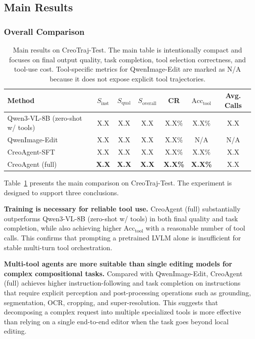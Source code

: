 \documentclass[11pt]{article}
\begin{document}
\subsection{Main Results}

\subsubsection{Overall Comparison}

\begin{table}[t]
\centering
\caption{Main results on CreoTraj-Test. The main table is intentionally compact and focuses on final output quality, task completion, tool selection correctness, and tool-use cost. Tool-specific metrics for QwenImage-Edit are marked as N/A because it does not expose explicit tool trajectories.}
\label{tab:main}
\begin{tabular}{lcccccc}
\toprule
\textbf{Method} & $S_{\text{inst}}$ & $S_{\text{qual}}$ & $S_{\text{overall}}$ & CR & $\text{Acc}_{\text{tool}}$ & Avg. Calls \\
\midrule
Qwen3-VL-8B (zero-shot w/ tools) & X.X & X.X & X.X & X.X\% & X.X\% & X.X \\
QwenImage-Edit & X.X & X.X & X.X & X.X\% & N/A & N/A \\
CreoAgent-SFT & X.X & X.X & X.X & X.X\% & X.X\% & X.X \\
CreoAgent (full) & \textbf{X.X} & \textbf{X.X} & \textbf{X.X} & \textbf{X.X\%} & \textbf{X.X\%} & X.X \\
\bottomrule
\end{tabular}
\end{table}


Table~\ref{tab:main} presents the main comparison on CreoTraj-Test. The experiment is designed to support three conclusions.

\textbf{Training is necessary for reliable tool use.} CreoAgent (full) substantially outperforms Qwen3-VL-8B (zero-shot w/ tools) in both final quality and task completion, while also achieving higher $\text{Acc}_{\text{tool}}$ with a reasonable number of tool calls. This confirms that prompting a pretrained LVLM alone is insufficient for stable multi-turn tool orchestration.

\textbf{Multi-tool agents are more suitable than single editing models for complex compositional tasks.} Compared with QwenImage-Edit, CreoAgent (full) achieves higher instruction-following and task completion on instructions that require explicit perception and post-processing operations such as grounding, segmentation, OCR, cropping, and super-resolution. This suggests that decomposing a complex request into multiple specialized tools is more effective than relying on a single end-to-end editor when the task goes beyond local editing.
\end{document}
